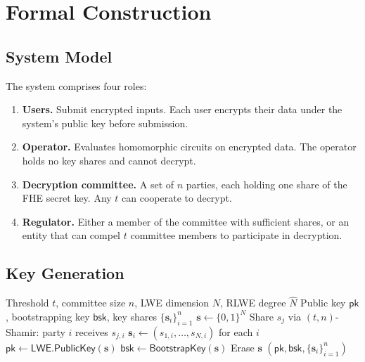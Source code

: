 \documentclass[11pt,a4paper]{article}
\begin{document}
\section{Formal Construction}
\label{sec:construction}

\subsection{System Model}

The system comprises four roles:

\begin{enumerate}[nosep]
  \item \textbf{Users.}  Submit encrypted inputs.  Each user encrypts
        their data under the system's public key before submission.
  \item \textbf{Operator.}  Evaluates homomorphic circuits on encrypted
        data.  The operator holds no key shares and cannot decrypt.
  \item \textbf{Decryption committee.}  A set of $n$ parties, each
        holding one share of the FHE secret key.  Any $t$ can
        cooperate to decrypt.
  \item \textbf{Regulator.}  Either a member of the committee with
        sufficient shares, or an entity that can compel $t$ committee
        members to participate in decryption.
\end{enumerate}

\subsection{Key Generation}

\begin{algorithm}[H]
\caption{Threshold FHE Key Generation}
\label{alg:keygen}
\begin{algorithmic}[1]
\Require Threshold $t$, committee size $n$, LWE dimension $N$,
         RLWE degree $\hat{N}$
\Ensure Public key $\mathsf{pk}$, bootstrapping key $\mathsf{bsk}$,
        key shares $\{\mathbf{s}_i\}_{i=1}^n$
\State $\mathbf{s} \leftarrow \{0,1\}^N$ 
  \State Share $s_j$ via $(t,n)$-Shamir: party $i$ receives $s_{j,i}$
\EndFor
\State $\mathbf{s}_i \leftarrow (s_{1,i}, \ldots, s_{N,i})$ for each $i$
\State $\mathsf{pk} \leftarrow \mathsf{LWE.PublicKey}(\mathbf{s})$
\State $\mathsf{bsk} \leftarrow \mathsf{BootstrapKey}(\mathbf{s})$
\State Erase $\mathbf{s}$ 
\State \Return $(\mathsf{pk}, \mathsf{bsk}, \{\mathbf{s}_i\}_{i=1}^n)$
\end{algorithmic}
\end{algorithm}
\end{document}
